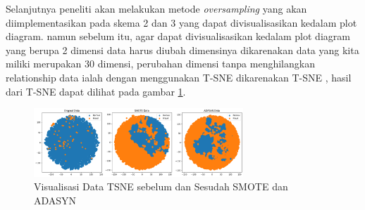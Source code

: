 Selanjutnya peneliti akan melakukan metode \textit{oversampling} yang akan diimplementasikan pada skema 2 dan 3 yang dapat divisualisasikan kedalam plot diagram. namun sebelum itu, agar dapat divisualisasikan kedalam plot diagram yang berupa 2 dimensi data harus diubah dimensinya dikarenakan data yang kita miliki merupakan 30 dimensi, perubahan dimensi tanpa menghilangkan relationship data ialah dengan menggunakan T-SNE dikarenakan T-SNE , hasil dari T-SNE dapat dilihat pada gambar \ref{fig:3.Visualisasi Data TSNE sebelum dan Sesudah SMOTE dan ADASYN}. 
\begin{figure}[H]
	\centering
	\includegraphics[width=0.7\textwidth]{figure/plot tsne.png}
	\caption{Visualisasi Data TSNE sebelum dan Sesudah SMOTE dan ADASYN}
	\label{fig:3.Visualisasi Data TSNE sebelum dan Sesudah SMOTE dan ADASYN}
\end{figure}

